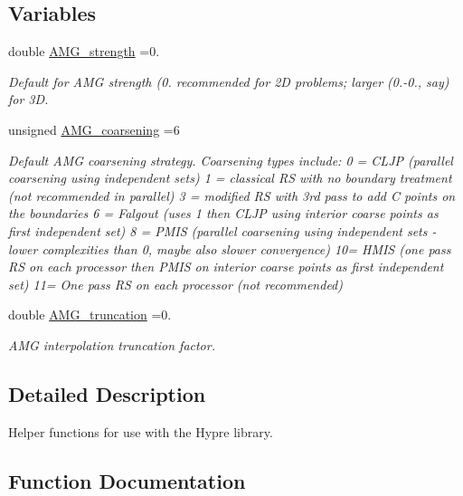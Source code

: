 \subsection*{Variables}
\begin{DoxyCompactItemize}
\item 
double \hyperlink{namespaceoomph_1_1HypreHelpers_aa3d3b58e30a8eba0adce2c335d2fc437}{A\+M\+G\+\_\+strength} =0.
\begin{DoxyCompactList}\small\item\em Default for A\+MG strength (0. recommended for 2D problems; larger (0.-\/0., say) for 3D. \end{DoxyCompactList}\item 
unsigned \hyperlink{namespaceoomph_1_1HypreHelpers_a8d34acec927aff8f150737afaec9651a}{A\+M\+G\+\_\+coarsening} =6
\begin{DoxyCompactList}\small\item\em Default A\+MG coarsening strategy. Coarsening types include\+: 0 = C\+L\+JP (parallel coarsening using independent sets) 1 = classical RS with no boundary treatment (not recommended in parallel) 3 = modified RS with 3rd pass to add C points on the boundaries 6 = Falgout (uses 1 then C\+L\+JP using interior coarse points as first independent set) 8 = P\+M\+IS (parallel coarsening using independent sets -\/ lower complexities than 0, maybe also slower convergence) 10= H\+M\+IS (one pass RS on each processor then P\+M\+IS on interior coarse points as first independent set) 11= One pass RS on each processor (not recommended) \end{DoxyCompactList}\item 
double \hyperlink{namespaceoomph_1_1HypreHelpers_aa32196f0215efa229ced79ce65e3887d}{A\+M\+G\+\_\+truncation} =0.
\begin{DoxyCompactList}\small\item\em A\+MG interpolation truncation factor. \end{DoxyCompactList}\end{DoxyCompactItemize}


\subsection{Detailed Description}
Helper functions for use with the Hypre library. 

\subsection{Function Documentation}
\mbox{\label{namespaceoomph_1_1HypreHelpers_a65765f3019c585e17822f30423b52096}} 

